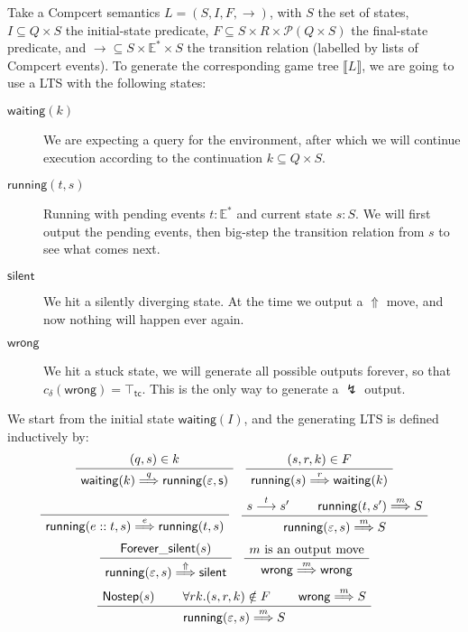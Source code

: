 \documentclass{article}
\newcommand{\kw}[1]{{\mathsf{#1}}}
\begin{document}
Take a Compcert semantics $L = (S, I, F, \rightarrow)$,
with $S$ the set of states,
$I \subseteq Q \times S$
the initial-state predicate,
$F \subseteq S \times R \times \mathcal{P}(Q \times S)$
the final-state predicate, and
${\rightarrow} \subseteq S \times \mathbb{E}^* \times S$
the transition relation (labelled by lists of Compcert events).
To generate the corresponding game tree $\llbracket L \rrbracket$,
we are going to use a LTS
with the following states:
\begin{description}
\item[$\kw{waiting}(k)$]
  We are expecting a query for the environment,
  after which we will continue execution according to the continuation
  $k \subseteq Q \times S$.
\item[$\kw{running}(t, s)$]
  Running with pending events $t : \mathbb{E}^*$ and current state $s : S$.
  We will first output the pending events,
  then big-step the transition relation from $s$
  to see what comes next.
\item[$\kw{silent}$]
  We hit a silently diverging state.
  At the time we output a $\Uparrow$ move,
  and now nothing will happen ever again.
\item[$\kw{wrong}$]
  We hit a stuck state,
  we will generate all possible outputs forever,
  so that $c_\delta(\kw{wrong}) = \top_\kw{tc}$.
  This is the only way to generate a $\lightning$ output.
\end{description}
We start from the initial state $\kw{waiting}(I)$,
and the generating LTS is defined inductively by:
\[
  \AxiomC{$(q, s) \in k$}
  \UnaryInfC{$\kw{waiting}(k) \stackrel{q}{\Longrightarrow} \kw{running(\varepsilon, s)}$}
  \DisplayProof
  \quad
  \AxiomC{$(s, r, k) \in F$}
  \UnaryInfC{$\kw{running}(s) \stackrel{r}{\Longrightarrow} \kw{waiting}(k)$}
  \DisplayProof
\]
\vspace{.5em}
\[
  \AxiomC{\rule[-.3\baselineskip]{0pt}{\baselineskip}}
  \UnaryInfC{$\kw{running}(e::t, s) \stackrel{e}{\Longrightarrow} \kw{running}(t, s)$}
  \DisplayProof
  \quad
  \AxiomC{$s \stackrel{t}{\longrightarrow} s'$}
  \AxiomC{$\kw{running}(t, s') \stackrel{m}{\Longrightarrow} S$}
  \BinaryInfC{$\kw{running}(\varepsilon, s) \stackrel{m}{\Longrightarrow} S$}
  \DisplayProof
\]
\vspace{.5em}
\[
  \AxiomC{$\kw{Forever\_silent}(s)$}
  \UnaryInfC{$\kw{running}(\varepsilon, s) \stackrel{\Uparrow}{\Longrightarrow} \kw{silent}$}
  \DisplayProof
  \quad
  \AxiomC{$m \mbox{ is an output move}$}
  \UnaryInfC{$\kw{wrong} \stackrel{m}{\Longrightarrow} \kw{wrong}$}
  \DisplayProof
\]
\vspace{.5em}
\[
  \AxiomC{$\kw{Nostep}(s)$}
  \AxiomC{$\forall r k . (s, r, k) \notin F$}
  \AxiomC{$\kw{wrong} \stackrel{m}{\Longrightarrow} S$}
  \TrinaryInfC{$\kw{running}(\varepsilon, s) \stackrel{m}{\Longrightarrow} S$}
  \DisplayProof
\]
\vspace{.5em}
\end{document}
